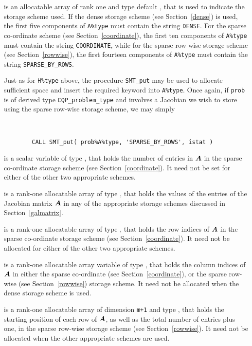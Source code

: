 \documentclass{galahad}
\newcommand{\packagename}{CQP}
\begin{document}
\begin{description}
\begin{description}

 is an allocatable array of rank one and type default \character,
that is used to indicate the storage scheme used. If the dense storage scheme
(see Section~\ref{dense}) is used,
the first five components of {\tt A\%type} must contain the
string {\tt DENSE}.
For the sparse co-ordinate scheme (see Section~\ref{coordinate}),
the first ten components of {\tt A\%type} must contain the
string {\tt COORDINATE}, while
for the sparse row-wise storage scheme (see Section~\ref{rowwise}),
the first fourteen components of {\tt A\%type} must contain the
string {\tt SPARSE\_BY\_ROWS}.

Just as for {\tt H\%type} above, the procedure {\tt SMT\_put}
may be used to allocate sufficient space and insert the required keyword
into {\tt A\%type}.
Once again, if {\tt prob} is of derived type {\tt \packagename\_problem\_type}
and involves a Jacobian we wish to store using the sparse row-wise
storage scheme, we may simply
{\tt
\begin{verbatim}
        CALL SMT_put( prob%A%type, 'SPARSE_BY_ROWS', istat )
\end{verbatim}
}
\noindent

 is a scalar variable of type \integer, that
holds the number of entries in ${\bm{A}}$
in the sparse co-ordinate storage scheme (see Section~\ref{coordinate}).
It need not be set for either of the other two appropriate schemes.

 is a rank-one allocatable array of type \realdp, that holds
the values of the entries of the Jacobian matrix ${\bm{A}}$ in any of the
appropriate storage schemes discussed in Section~\ref{galmatrix}.

 is a rank-one allocatable array of type \integer,
that holds the row indices of ${\bm{A}}$ in the sparse co-ordinate storage
scheme (see Section~\ref{coordinate}).
It need not be allocated for either of the other two appropriate schemes.

 is a rank-one allocatable array variable of type \integer,
that holds the column indices of ${\bm{A}}$ in either the sparse co-ordinate
(see Section~\ref{coordinate}), or the sparse row-wise
(see Section~\ref{rowwise}) storage scheme.
It need not be allocated when the dense storage scheme is used.

 is a rank-one allocatable array of dimension {\tt m+1} and type
\integer, that holds the
starting position of each row of ${\bm{A}}$, as well
as the total number of entries plus one, in the sparse row-wise storage
scheme (see Section~\ref{rowwise}). It need not be allocated when the
other appropriate schemes are used.


\end{description}
\end{description}
\end{document}
